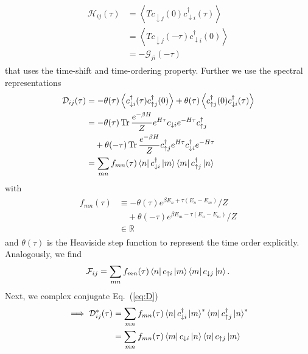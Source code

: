 \documentclass[aps,prb,twocolumn,groupedaddress,amsmath,amssymb]{revtex4-1}
\newcommand{\up}{\uparrow}
\newcommand{\dn}{\downarrow}
\newcommand{\refeq}[1]{Eq.~(\ref{#1})}
\newcommand{\expectv}[1]{\left< #1 \right>}
\newcommand{\nambu}[1]{\mathcal{#1}}
\begin{document}
\begin{align}
  \label{eq:H}
  \begin{split}
    \nambu{H}_{ij}(\tau)&=\expectv{Tc_{\dn j}(0)c^\dagger_{\dn i}(\tau)}\\
    &=\expectv{Tc_{\dn j}(-\tau)c^\dagger_{\dn i}(0)}\\
    &=-\nambu{G}_{ji}(-\tau)
  \end{split}
\end{align}
that uses the time-shift and time-ordering property. Further we use the spectral representations
\begin{align}
  \label{eq:D}
  \begin{split}
    \nambu{D}_{ij}(\tau)&=-\theta(\tau)\expectv{c^\dagger_{\dn i}(\tau)c^\dagger_{\up j}(0)} + \theta(\-\tau)\expectv{c^\dagger_{\up j}(0)c^\dagger_{\dn i}(\tau)}\\
    &=-\theta(\tau)\Tr\frac{e^{-\beta H}}{Z}e^{H\tau}c_{\dn i}e^{-H\tau}c^\dagger_{\up j}\\
    &\quad+\theta(-\tau)\Tr\frac{e^{-\beta H}}{Z}c^\dagger_{\up j}e^{H\tau}c^\dagger_{\dn i}e^{-H\tau}\\
    &=\sum_{mn}f_{mn}(\tau)\bra{n}c^\dagger_{\dn i}\ket{m} \bra{m}c^\dagger_{\up j}\ket{n}
  \end{split}
\end{align}
with
\begin{align}
  \label{eq:fmntau}
  \begin{split}
    f_{mn}(\tau)&\equiv-\theta(\tau)e^{\beta E_n + \tau(E_n - E_m)}/Z\\
    &\quad+\theta(-\tau)e^{\beta E_m - \tau(E_n - E_m)}/Z\\
    &\in\mathbb{R}
  \end{split}
\end{align}
and $\theta(\tau)$ is the Heaviside step function to represent the time order explicitly. Analogously, we find 
\begin{align}
  \label{eq:F}
  \begin{split}
    \nambu{F}_{ij}=\sum_{mn}f_{mn}(\tau)\bra{n}c_{\up i}\ket{m} \bra{m}c_{\dn j}\ket{n}.
  \end{split}
\end{align}
Next, we complex conjugate \refeq{eq:D}
\begin{align}
  \label{eq:Dconjugate}
  \begin{split}
    \implies\nambu{D}^\ast_{ij}(\tau)&=\sum_{mn}f_{mn}(\tau)\bra{n}c^\dagger_{\dn i}\ket{m}^\ast \bra{m}c^\dagger_{\up j}\ket{n}^\ast\\
    &=\sum_{mn}f_{mn}(\tau)\bra{m}c_{\dn i}\ket{n} \bra{n}c_{\up j}\ket{m}
  \end{split}
\end{align}
\end{document}
